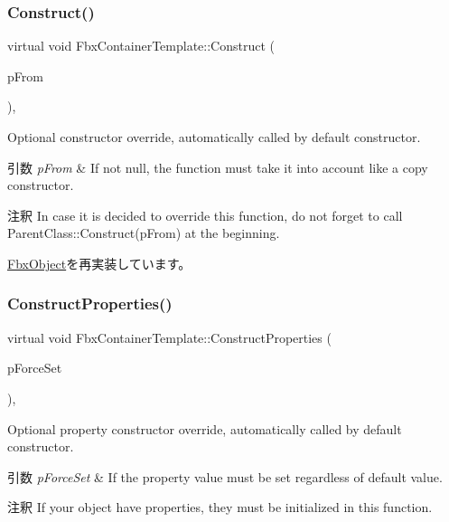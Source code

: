 \subsubsection{\texorpdfstring{Construct()}{Construct()}}
{\footnotesize\ttfamily virtual void Fbx\+Container\+Template\+::\+Construct (\begin{DoxyParamCaption}\item[{const \hyperlink{class_fbx_object}{Fbx\+Object} $\ast$}]{p\+From }\end{DoxyParamCaption})\hspace{0.3cm}{\ttfamily [protected]}, {\ttfamily [virtual]}}

Optional constructor override, automatically called by default constructor. 
\begin{DoxyParams}{引数}
{\em p\+From} & If not null, the function must take it into account like a copy constructor. \\
\hline
\end{DoxyParams}
\begin{DoxyRemark}{注釈}
In case it is decided to override this function, do not forget to call Parent\+Class\+::\+Construct(p\+From) at the beginning. 
\end{DoxyRemark}


\hyperlink{class_fbx_object_a313503bc645af3fdceb4a99ef5cea7eb}{Fbx\+Object}を再実装しています。

\mbox{\label{class_fbx_container_template_ae43300ebc308b87a6aae824daff21158}} 
\subsubsection{\texorpdfstring{Construct\+Properties()}{ConstructProperties()}}
{\footnotesize\ttfamily virtual void Fbx\+Container\+Template\+::\+Construct\+Properties (\begin{DoxyParamCaption}\item[{bool}]{p\+Force\+Set }\end{DoxyParamCaption})\hspace{0.3cm}{\ttfamily [protected]}, {\ttfamily [virtual]}}

Optional property constructor override, automatically called by default constructor. 
\begin{DoxyParams}{引数}
{\em p\+Force\+Set} & If the property value must be set regardless of default value. \\
\hline
\end{DoxyParams}
\begin{DoxyRemark}{注釈}
If your object have properties, they must be initialized in this function. 
\end{DoxyRemark}


